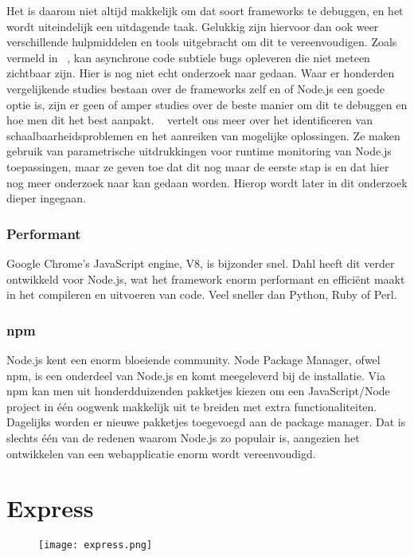 Het is daarom niet altijd makkelijk om dat soort frameworks te debuggen, en het wordt uiteindelijk een uitdagende taak. Gelukkig zijn hiervoor dan ook weer verschillende hulpmiddelen en tools uitgebracht om dit te vereenvoudigen. Zoals vermeld in ~\autocite{Runtime2017}, kan asynchrone code subtiele bugs opleveren die niet meteen zichtbaar zijn. Hier is nog niet echt onderzoek naar gedaan. Waar er honderden vergelijkende studies bestaan over de frameworks zelf en of Node.js een goede optie is, zijn er geen of amper studies over de beste manier om dit te debuggen en hoe men dit het best aanpakt. ~\autocite{Runtime2017} vertelt ons meer over het identificeren van schaalbaarheidsproblemen en het aanreiken van mogelijke oplossingen. Ze maken gebruik van parametrische uitdrukkingen voor runtime monitoring van Node.js toepassingen, maar ze geven toe dat dit nog maar de eerste stap is en dat hier nog meer onderzoek naar kan gedaan worden. Hierop wordt later in dit onderzoek dieper ingegaan.

\subsubsection{Performant}
\label{sec:fast}

Google Chrome's JavaScript engine, V8, is bijzonder snel. Dahl heeft dit verder ontwikkeld voor Node.js, wat het framework enorm performant en efficiënt maakt in het compileren en uitvoeren van code. Veel sneller dan Python, Ruby of Perl.

\subsubsection{npm}
\label{sec:npm}

Node.js kent een enorm bloeiende community. Node Package Manager, ofwel npm, is een onderdeel van Node.js en komt meegeleverd bij de installatie. Via npm kan men uit honderdduizenden pakketjes kiezen om een JavaScript/Node project in één oogwenk makkelijk uit te breiden met extra functionaliteiten. Dagelijks worden er nieuwe pakketjes toegevoegd aan de package manager. Dat is slechts één van de redenen waarom Node.js zo populair is, aangezien het ontwikkelen van een webapplicatie enorm wordt vereenvoudigd.   

\section{Express}
\label{sec:express}

\begin{figure}[h]
	\centering
	\texttt{[image: express.png]}
	\label{fig:express}
\end{figure}

